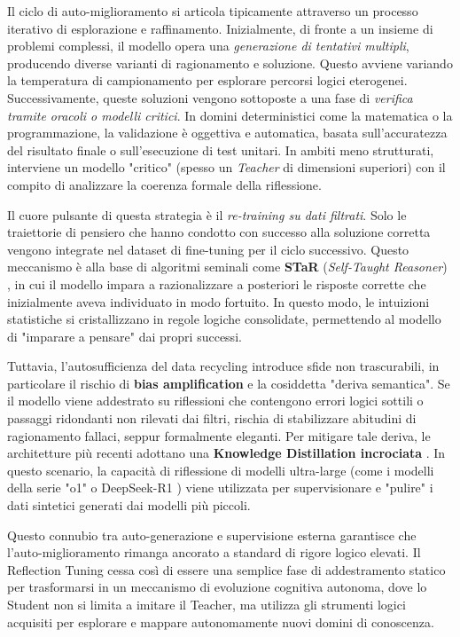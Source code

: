 Il ciclo di auto-miglioramento si articola tipicamente attraverso un processo iterativo di esplorazione e raffinamento. Inizialmente, di fronte a un insieme di problemi complessi, il modello opera una \textit{generazione di tentativi multipli}, producendo diverse varianti di ragionamento e soluzione. Questo avviene variando la temperatura di campionamento per esplorare percorsi logici eterogenei. Successivamente, queste soluzioni vengono sottoposte a una fase di \textit{verifica tramite oracoli o modelli critici}. In domini deterministici come la matematica o la programmazione, la validazione è oggettiva e automatica, basata sull'accuratezza del risultato finale o sull'esecuzione di test unitari. In ambiti meno strutturati, interviene un modello "critico" (spesso un \textit{Teacher} di dimensioni superiori) con il compito di analizzare la coerenza formale della riflessione.



Il cuore pulsante di questa strategia è il \textit{re-training su dati filtrati}. Solo le traiettorie di pensiero che hanno condotto con successo alla soluzione corretta vengono integrate nel dataset di fine-tuning per il ciclo successivo. Questo meccanismo è alla base di algoritmi seminali come \textbf{STaR} (\textit{Self-Taught Reasoner}) \cite{zelikman2022star}, in cui il modello impara a razionalizzare a posteriori le risposte corrette che inizialmente aveva individuato in modo fortuito. In questo modo, le intuizioni statistiche si cristallizzano in regole logiche consolidate, permettendo al modello di "imparare a pensare" dai propri successi.

Tuttavia, l'autosufficienza del data recycling introduce sfide non trascurabili, in particolare il rischio di \textbf{bias amplification} e la cosiddetta "deriva semantica". Se il modello viene addestrato su riflessioni che contengono errori logici sottili o passaggi ridondanti non rilevati dai filtri, rischia di stabilizzare abitudini di ragionamento fallaci, seppur formalmente eleganti. Per mitigare tale deriva, le architetture più recenti adottano una \textbf{Knowledge Distillation incrociata} \cite{madaan2023self,shinn2023reflexion}. In questo scenario, la capacità di riflessione di modelli ultra-large (come i modelli della serie "o1" o DeepSeek-R1 \cite{deepseekr1_2025}) viene utilizzata per supervisionare e "pulire" i dati sintetici generati dai modelli più piccoli. 

Questo connubio tra auto-generazione e supervisione esterna garantisce che l'auto-miglioramento rimanga ancorato a standard di rigore logico elevati. Il Reflection Tuning cessa così di essere una semplice fase di addestramento statico per trasformarsi in un meccanismo di evoluzione cognitiva autonoma, dove lo Student non si limita a imitare il Teacher, ma utilizza gli strumenti logici acquisiti per esplorare e mappare autonomamente nuovi domini di conoscenza.


